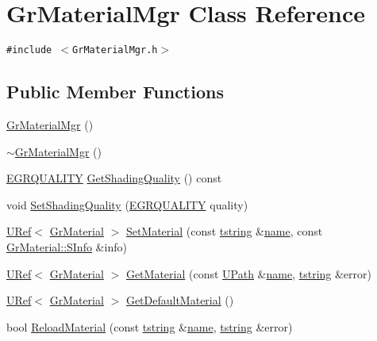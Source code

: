 \hypertarget{class_gr_material_mgr}{
\section{GrMaterialMgr Class Reference}
\label{class_gr_material_mgr}
}
{\tt \#include $<$GrMaterialMgr.h$>$}

\subsection*{Public Member Functions}
\begin{CompactItemize}
\item 
\hyperlink{class_gr_material_mgr_f8c35eace8645ea7aa4be86286438670}{GrMaterialMgr} ()
\item 
\hyperlink{class_gr_material_mgr_6f3351d8076b7507fa619d690a5080bc}{$\sim$GrMaterialMgr} ()
\item 
\hyperlink{enums_8h_697c1ee1354746841860d5bf9f81c033}{EGRQUALITY} \hyperlink{class_gr_material_mgr_9a75c5cd132b7bffec133e4d9e8f4221}{GetShadingQuality} () const 
\item 
void \hyperlink{class_gr_material_mgr_1d585959cdac4e110fce8cdaa39310fa}{SetShadingQuality} (\hyperlink{enums_8h_697c1ee1354746841860d5bf9f81c033}{EGRQUALITY} quality)
\item 
\hyperlink{class_u_ref}{URef}$<$ \hyperlink{class_gr_material}{GrMaterial} $>$ \hyperlink{class_gr_material_mgr_7134ce45c3dc3b873ea2c5deb896ba08}{SetMaterial} (const \hyperlink{common__afx_8h_816fa58fd77499b0edb2c69ebe803d5c}{tstring} \&\hyperlink{glext__bak_8h_bb62efe59ccdd153ce42e1a418352209}{name}, const \hyperlink{struct_gr_material_1_1_s_info}{GrMaterial::SInfo} \&info)
\item 
\hyperlink{class_u_ref}{URef}$<$ \hyperlink{class_gr_material}{GrMaterial} $>$ \hyperlink{class_gr_material_mgr_5cd1ffc48f5700668491231502af7be9}{GetMaterial} (const \hyperlink{class_u_path}{UPath} \&\hyperlink{glext__bak_8h_bb62efe59ccdd153ce42e1a418352209}{name}, \hyperlink{common__afx_8h_816fa58fd77499b0edb2c69ebe803d5c}{tstring} \&error)
\item 
\hyperlink{class_u_ref}{URef}$<$ \hyperlink{class_gr_material}{GrMaterial} $>$ \hyperlink{class_gr_material_mgr_43336b522deb18479fb8a40756ef37f0}{GetDefaultMaterial} ()
\item 
bool \hyperlink{class_gr_material_mgr_fd19248af5f08710d9607b9db84c52b5}{ReloadMaterial} (const \hyperlink{common__afx_8h_816fa58fd77499b0edb2c69ebe803d5c}{tstring} \&\hyperlink{glext__bak_8h_bb62efe59ccdd153ce42e1a418352209}{name}, \hyperlink{common__afx_8h_816fa58fd77499b0edb2c69ebe803d5c}{tstring} \&error)

\end{CompactItemize}
